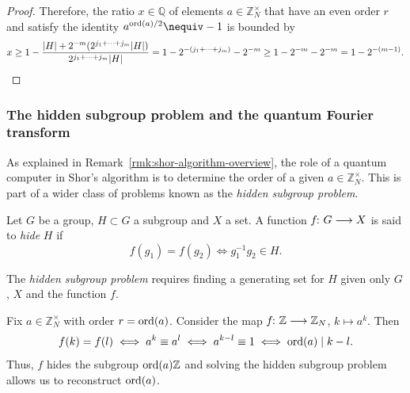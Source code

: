 \documentclass[a4paper, oneside, 12pt]{amsart}
\begin{document}
\begin{proof}
 Therefore, the ratio \(x \in \mathbb{Q}\) of elements \(a\in \mathbb{Z}_{N}^{\times}\) that have an even order \(r\) and satisfy the identity \(a^{\ord(a)/2}\nequiv -1\) is bounded by
  \begin{equation*}
    x \geq 1 - \frac{|H| + 2^{-m}(2^{j_{1} + \dots + j_{m}}|H|)}{2^{j_{1} + \dots + j_{m}}|H|}
    = 1 - 2^{-(j_{1} + \dots + j_{m})} - 2^{-m}
    \geq 1- 2^{-m} - 2^{-m} = 1- 2^{-(m-1)}. \qedhere
  \end{equation*}
\end{proof}

\subsubsection{The hidden subgroup problem and the quantum Fourier transform}\label{sec:the-quantum-fourier-transform-and-the-hidden-subgroup-problem}

As explained in Remark~\ref{rmk:shor-algorithm-overview}, the role of a quantum computer in Shor's algorithm is to determine the order of a given \(a \in \mathbb{Z}_{N}^{\times}\).
This is part of a wider class of problems known as the \emph{hidden subgroup problem}.

\begin{definition}\label{def:HSP}
  Let \(G\) be a group, \(H \subset G\) a subgroup and \(X\) a set.
  A function \(f \from G \to X\) is said to \emph{hide} \(H\)  if
  \begin{equation*}
    f(g_1) = f(g_2) \iff g_1^{-1}g_2 \in H.
  \end{equation*}

  The \emph{hidden subgroup problem} requires finding a generating set for \(H\) given only \(G\), \(X\) and the function \(f\).
\end{definition}

\begin{remark}\label{rmk:order-finding-as-HSP}
  Fix \(a \in \mathbb{Z}_N^\times\) with order \(r = \operatorname{ord}(a)\).
  Consider the map \(f \from \mathbb{Z} \to \mathbb{Z}_{N}\), \(k \mapsto a^{k}\).
  Then
  \begin{equation*}
    f(k) = f(l) \iff a^{k}\equiv a^{l} \iff a^{k-l}\equiv 1 \iff \operatorname{ord}(a) \mid k-l.
  \end{equation*}
  Thus, \(f\) hides the subgroup \(\operatorname{ord}(a) \mathbb{Z}\) and solving the hidden subgroup problem allows us to reconstruct \(\operatorname{ord}(a)\).
\end{remark}
\end{document}
